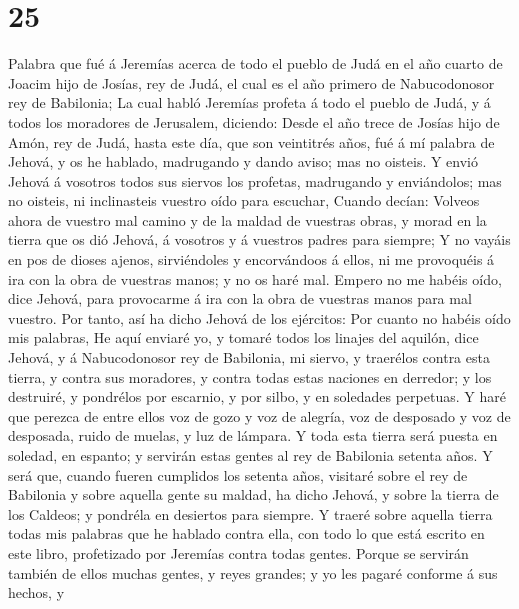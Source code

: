 \hypertarget{section-24}{%
\section{25}\label{section-24}}

 Palabra que fué á Jeremías acerca de todo el pueblo de
Judá en el año cuarto de Joacim hijo de Josías, rey de Judá, el cual es
el año primero de Nabucodonosor rey de Babilonia;  La cual
habló Jeremías profeta á todo el pueblo de Judá, y á todos los moradores
de Jerusalem, diciendo:  Desde el año trece de Josías hijo
de Amón, rey de Judá, hasta este día, que son veintitrés años, fué á mí
palabra de Jehová, y os he hablado, madrugando y dando aviso; mas no
oisteis.  Y envió Jehová á vosotros todos sus siervos los
profetas, madrugando y enviándolos; mas no oisteis, ni inclinasteis
vuestro oído para escuchar,  Cuando decían: Volveos ahora
de vuestro mal camino y de la maldad de vuestras obras, y morad en la
tierra que os dió Jehová, á vosotros y á vuestros padres para siempre;
 Y no vayáis en pos de dioses ajenos, sirviéndoles y
encorvándoos á ellos, ni me provoquéis á ira con la obra de vuestras
manos; y no os haré mal.  Empero no me habéis oído, dice
Jehová, para provocarme á ira con la obra de vuestras manos para mal
vuestro.  Por tanto, así ha dicho Jehová de los ejércitos:
Por cuanto no habéis oído mis palabras,  He aquí enviaré
yo, y tomaré todos los linajes del aquilón, dice Jehová, y á
Nabucodonosor rey de Babilonia, mi siervo, y traerélos contra esta
tierra, y contra sus moradores, y contra todas estas naciones en
derredor; y los destruiré, y pondrélos por escarnio, y por silbo, y en
soledades perpetuas.  Y haré que perezca de entre ellos
voz de gozo y voz de alegría, voz de desposado y voz de desposada, ruido
de muelas, y luz de lámpara.  Y toda esta tierra será
puesta en soledad, en espanto; y servirán estas gentes al rey de
Babilonia setenta años.  Y será que, cuando fueren
cumplidos los setenta años, visitaré sobre el rey de Babilonia y sobre
aquella gente su maldad, ha dicho Jehová, y sobre la tierra de los
Caldeos; y pondréla en desiertos para siempre.  Y traeré
sobre aquella tierra todas mis palabras que he hablado contra ella, con
todo lo que está escrito en este libro, profetizado por Jeremías contra
todas gentes.  Porque se servirán también de ellos muchas
gentes, y reyes grandes; y yo les pagaré conforme á sus hechos, y
